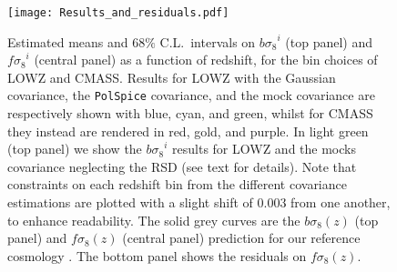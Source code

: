 \documentclass[astrosymb,twocolumn]{aastex631}
\newcommand{\bs}{\ensuremath{b\sigma_8}}
\renewcommand{\fs}{\ensuremath{f\!\sigma_8}}
\begin{document}
\begin{figure}
\centering
\texttt{[image: Results\_and\_residuals.pdf]}
\caption{Estimated means and \(68\%\) C.L.\ intervals on \(\bs^i\) (top panel) and \(\fs^i\) (central panel) as a function of redshift, for the bin choices of LOWZ and CMASS. Results for LOWZ with the Gaussian covariance, the \texttt{PolSpice} covariance, and the mock covariance are respectively shown with blue, cyan, and green, whilst for CMASS they instead are rendered in red, gold, and purple. In light green (top panel) we show the \(\bs^i\) results for LOWZ and the mocks covariance neglecting the RSD (see text for details). Note that constraints on each redshift bin from the different covariance estimations are plotted with a slight shift of \(0.003\) from one another, to enhance readability. The solid grey curves are the \(\bs(z)\) (top panel) and \(\fs(z)\) (central panel) prediction for our reference cosmology \citep{Ade2015}. The bottom panel shows the residuals on \(\fs(z)\).}
\label{fig:results}
\end{figure}
\end{document}
